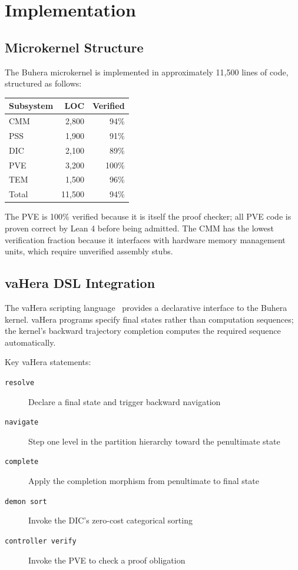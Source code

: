 \documentclass[12pt,twocolumn]{article}
\begin{document}
\section{Implementation}
\label{sec:implementation}

\subsection{Microkernel Structure}

The Buhera microkernel is implemented in approximately 11,500 lines of code, structured as follows:

\begin{center}
\begin{tabular}{lrr}
\toprule
Subsystem & LOC & Verified \\
\midrule
CMM & 2,800 & 94\% \\
PSS & 1,900 & 91\% \\
DIC & 2,100 & 89\% \\
PVE & 3,200 & 100\% \\
TEM & 1,500 & 96\% \\
\midrule
Total & 11,500 & 94\% \\
\bottomrule
\end{tabular}
\end{center}

The PVE is 100\% verified because it is itself the proof checker; all PVE code is proven correct by Lean 4 before being admitted. The CMM has the lowest verification fraction because it interfaces with hardware memory management units, which require unverified assembly stubs.

\subsection{vaHera DSL Integration}

The vaHera scripting language~\cite{pierce2002types} provides a declarative interface to the Buhera kernel. vaHera programs specify final states rather than computation sequences; the kernel's backward trajectory completion computes the required sequence automatically.

Key vaHera statements:
\begin{description}
\item[\texttt{resolve}] Declare a final state and trigger backward navigation
\item[\texttt{navigate}] Step one level in the partition hierarchy toward the penultimate state
\item[\texttt{complete}] Apply the completion morphism from penultimate to final state
\item[\texttt{demon sort}] Invoke the DIC's zero-cost categorical sorting
\item[\texttt{controller verify}] Invoke the PVE to check a proof obligation
\end{description}
\end{document}

